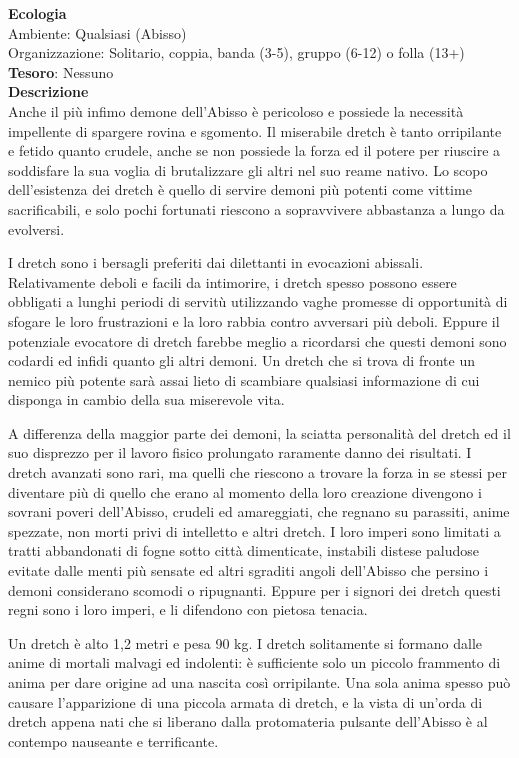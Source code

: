 \begin{multicols}{2}
	\textbf{Ecologia}\\
	Ambiente: Qualsiasi (Abisso)\\
	Organizzazione: Solitario, coppia, banda (3-5), gruppo (6-12) o folla (13+)\\
	\textbf{Tesoro}: Nessuno\\
	\textbf{Descrizione}\\
	Anche il più infimo demone dell'Abisso è pericoloso e possiede la necessità impellente di spargere rovina e sgomento. Il miserabile dretch è tanto orripilante e fetido quanto crudele, anche se non possiede la forza ed il potere per riuscire a soddisfare la sua voglia di brutalizzare gli altri nel suo reame nativo. Lo scopo dell'esistenza dei dretch è quello di servire demoni più potenti come vittime sacrificabili, e solo pochi fortunati riescono a sopravvivere abbastanza a lungo da evolversi.

	I dretch sono i bersagli preferiti dai dilettanti in evocazioni abissali. Relativamente deboli e facili da intimorire, i dretch spesso possono essere obbligati a lunghi periodi di servitù utilizzando vaghe promesse di opportunità di sfogare le loro frustrazioni e la loro rabbia contro avversari più deboli. Eppure il potenziale evocatore di dretch farebbe meglio a ricordarsi che questi demoni sono codardi ed infidi quanto gli altri demoni. Un dretch che si trova di fronte un nemico più potente sarà assai lieto di scambiare qualsiasi informazione di cui disponga in cambio della sua miserevole vita.

	A differenza della maggior parte dei demoni, la sciatta personalità del dretch ed il suo disprezzo per il lavoro fisico prolungato raramente danno dei risultati. I dretch avanzati sono rari, ma quelli che riescono a trovare la forza in se stessi per diventare più di quello che erano al momento della loro creazione divengono i sovrani poveri dell'Abisso, crudeli ed amareggiati, che regnano su parassiti, anime spezzate, non morti privi di intelletto e altri dretch. I loro imperi sono limitati a tratti abbandonati di fogne sotto città dimenticate, instabili distese paludose evitate dalle menti più sensate ed altri sgraditi angoli dell'Abisso che persino i demoni considerano scomodi o ripugnanti. Eppure per i signori dei dretch questi regni sono i loro imperi, e li difendono con pietosa tenacia.

	Un dretch è alto 1,2 metri e pesa 90 kg. I dretch solitamente si formano dalle anime di mortali malvagi ed indolenti: è sufficiente solo un piccolo frammento di anima per dare origine ad una nascita così orripilante. Una sola anima spesso può causare l'apparizione di una piccola armata di dretch, e la vista di un'orda di dretch appena nati che si liberano dalla protomateria pulsante dell'Abisso è al contempo nauseante e terrificante.


\end{multicols}
